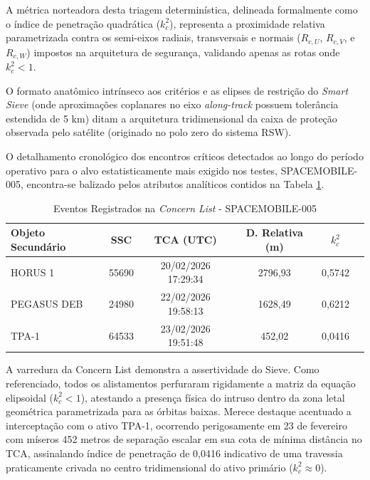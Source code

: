 A métrica norteadora desta triagem determinística, delineada formalmente como o índice de penetração quadrática ($k_c^2$), representa a proximidade relativa parametrizada contra os semi-eixos radiais, transversais e normais ($R_{c,U}$, $R_{c,V}$, e $R_{c,W}$) impostos na arquitetura de segurança, validando apenas as rotas onde $k_c^2 < 1$. 

O formato anatômico intrínseco aos critérios e as elipses de restrição do \textit{Smart Sieve} (onde aproximações coplanares no eixo \textit{along-track} possuem tolerância estendida de 5 km) ditam a arquitetura tridimensional da caixa de proteção observada pelo satélite (originado no polo zero do sistema RSW).

O detalhamento cronológico dos encontros críticos detectados ao longo do período operativo para o alvo estatisticamente mais exigido nos testes, SPACEMOBILE-005, encontra-se balizado pelos atributos analíticos contidos na Tabela \ref{tab:eventos_61046}.

\begin{table}[H]
    \centering
    \caption{Eventos Registrados na \textit{Concern List} - SPACEMOBILE-005}
    \label{tab:eventos_61046}
    \small
    \begin{tabular}{l c c c c c}
        \toprule
        \textbf{Objeto Secundário} & \textbf{SSC} & \textbf{TCA (UTC)} & \textbf{D. Relativa (m)} & \textbf{$k_c^2$} \\
        \midrule
        HORUS 1 & 55690 & 20/02/2026 17:29:34 & 2796,93 & 0,5742 \\
        PEGASUS DEB & 24980 & 22/02/2026 19:58:13 & 1628,49 & 0,6212 \\
        TPA-1 & 64533 & 23/02/2026 19:51:48 & 452,02 & 0,0416 \\
        \bottomrule
    \end{tabular}
\end{table}

A varredura da Concern List demonstra a assertividade do Sieve. Como referenciado, todos os alistamentos perfuraram rigidamente a matriz da equação elipsoidal ($k_c^2 < 1$), atestando a presença física do intruso dentro da zona letal geométrica parametrizada para as órbitas baixas. Merece destaque acentuado a interceptação com o ativo TPA-1, ocorrendo perigosamente em 23 de fevereiro com míseros 452 metros de separação escalar em sua cota de mínima distância no TCA, assinalando índice de penetração de 0,0416 indicativo de uma travessia praticamente crivada no centro tridimensional do ativo primário ($k_c^2 \approx 0$).

